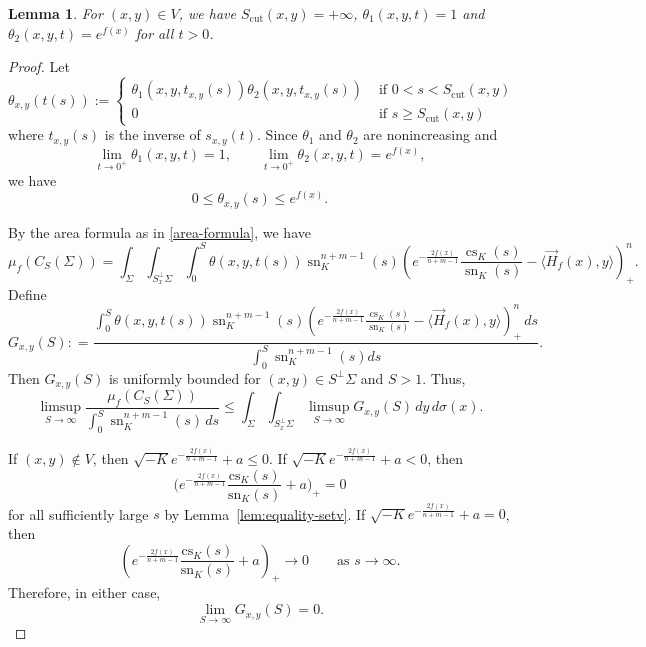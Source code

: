 \documentclass[psamsfonts]{amsart}
\newtheorem{lem}[thm]{Lemma}
\theoremstyle{definition}
\theoremstyle{remark}
\numberwithin{equation}{section}
\begin{document}
\begin{lem}\label{lem:equality-theta}
    For $(x,y) \in V$, we have $S_{\mathrm{cut}}(x,y) = + \infty$, $\theta_1(x,y,t) =1$ and $\theta_2(x,y,t) = e^{f(x)}$ for all $t >0$.
\end{lem}
\begin{proof}
    Let $$\theta_{x,y}(t(s)) := \begin{cases}
        \theta_1 ( x, y, t_{x,y}(s)) \theta_2 ( x,y, t_{x,y}(s)) &\mbox{ if } 0 < s< S_{\mathrm{cut}}(x,y)\\
        0 & \mbox{ if } s \geq S_{\mathrm{cut}}(x,y)
    \end{cases}$$
    where $t_{x,y}(s)$ is the inverse of $s_{x,y}(t)$.
    Since $\theta_1$ and $\theta_2$ are nonincreasing and
    $$\lim_{t\to0^+}\theta_1(x,y,t)=1,\qquad\lim_{t\to0^+}\theta_2(x,y,t)=e^{f(x)},
    $$
    we have
    $$
        0\leq \theta_{x,y}(s)\leq e^{f(x)}.
    $$
    
    By the area formula as in \eqref{area-formula}, we have 
    $$\mu_f ( C_S(\Sigma)) = \int_\Sigma \int_{S_x^\perp \Sigma} \int_0^S \theta(x,y,t(s)) \operatorname{sn}_K^{n+m-1}(s)\left( e^{-\frac{2f(x)}{n+m-1}} \frac{\operatorname{cs}_K(s)}{\operatorname{sn}_K(s)} - \langle \vec H_f (x), y \rangle \right)_+^n.$$
    Define
    $$G_{x,y}(S) : = \frac{\int_0^S \theta(x,y,t(s)) \operatorname{sn}_K^{n+m-1}(s)\left( e^{-\frac{2f(x)}{n+m-1}} \frac{\operatorname{cs}_K(s)}{\operatorname{sn}_K(s)} - \langle \vec H_f (x), y \rangle \right)_+^n\, ds}{\int_0^S \operatorname{sn}_K^{n+m-1}(s) ds}.$$
    Then $G_{x,y}(S)$ is uniformly bounded for $(x,y) \in S^\perp \Sigma$ and $S>1$.
    Thus,
    $$\limsup_{S \to \infty} \frac{\mu_f (C_S (\Sigma))}{\int_0^S \operatorname{sn}_K^{n+m-1} (s) \, ds } \leq  \int_{\Sigma} \int_{S_x^\perp \Sigma}\limsup_{S \to \infty } G_{x,y}(S) \, dy \, d\sigma(x).$$

    If $(x,y)\notin V$, then $\sqrt{ - K }e^{ - \frac{2f(x)}{n+m-1}} + a\leq 0$.
    If $\sqrt{ - K }e^{ - \frac{2f(x)}{n+m-1}} + a<0$, then
    $$
        \bigl(e^{- \frac{2f(x)}{n+m-1}} \frac{\mathrm{cs}_K (s)}{\mathrm{sn}_K(s)} + a \bigr)_+=0
    $$
    for all sufficiently large $s$ by Lemma~\ref{lem:equality-setv}. If
    $\sqrt{ - K }e^{ - \frac{2f(x)}{n+m-1}} + a=0$, then
    $$
        \left(e^{- \frac{2f(x)}{n+m-1}} \frac{\mathrm{cs}_K (s)}{\mathrm{sn}_K(s)} + a \right)_+\longrightarrow 0
        \qquad\text{as }s\to\infty.
    $$
    Therefore, in either case,
    $$
        \lim_{S\to\infty}G_{x,y}(S)=0.
    $$



\end{proof}
\end{document}
